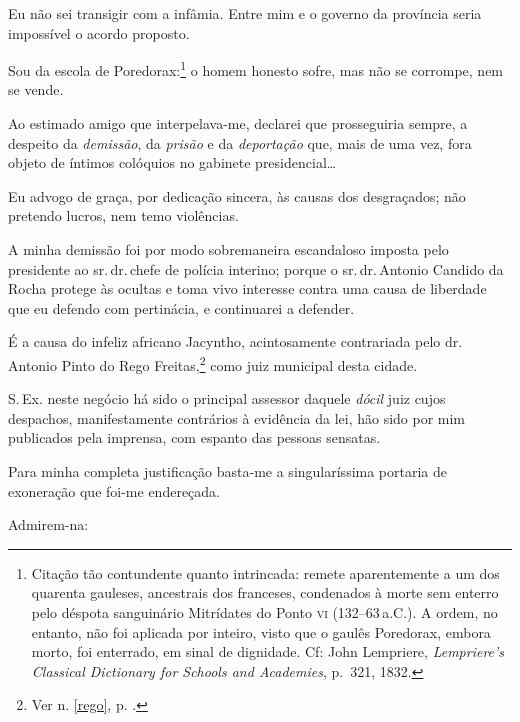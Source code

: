 Eu não sei transigir com a infâmia. Entre mim e o governo da província
seria impossível o acordo proposto.

Sou da escola de Poredorax:\footnote{Citação tão contundente quanto
  intrincada: remete aparentemente a um dos quarenta gauleses,
  ancestrais dos franceses, condenados à morte sem enterro pelo déspota
  sanguinário Mitrídates do Ponto \textsc{vi} (132--63\,a.C.). A ordem, no
  entanto, não foi aplicada por inteiro, visto que o gaulês Poredorax,
  embora morto, foi enterrado, em sinal de dignidade. Cf: John
  Lempriere, \emph{Lempriere's Classical Dictionary for Schools and
  Academies}, p.~321, 1832.} o homem honesto sofre, mas não se
corrompe, nem se vende.

Ao estimado amigo que interpelava-me, declarei que prosseguiria sempre,
a despeito da \emph{demissão}, da \emph{prisão} e da \emph{deportação}
que, mais de uma vez, fora objeto de íntimos colóquios no gabinete
presidencial\ldots{}

Eu advogo de graça, por dedicação sincera, às causas dos desgraçados;
não pretendo lucros, nem temo violências.

A minha demissão foi por modo sobremaneira escandaloso imposta pelo
presidente ao sr.\,dr.\,chefe de polícia interino; porque o sr.\,dr.\,Antonio Candido da Rocha protege às ocultas e toma vivo interesse contra
uma causa de liberdade que eu defendo com pertinácia, e continuarei a
defender.

É a causa do infeliz africano Jacyntho, acintosamente contrariada pelo
dr.\,Antonio Pinto do Rego Freitas,\footnote{Ver n. \ref{rego}, p. \pageref{rego}.} 
como juiz municipal desta cidade.

S.\,Ex. neste negócio há sido o principal assessor daquele \emph{dócil}
juiz cujos despachos, manifestamente contrários à evidência da lei, hão
sido por mim publicados pela imprensa, com espanto das pessoas sensatas.

Para minha completa justificação basta-me a singularíssima portaria de
exoneração que foi-me endereçada.

Admirem-na:

